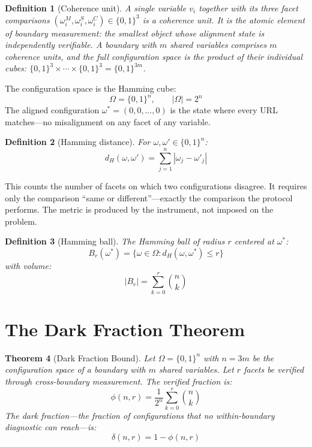 \documentclass[11pt,a4paper]{article}
\newtheorem{theorem}{Theorem}
\newtheorem{definition}[theorem]{Definition}
\begin{document}
\begin{definition}[Coherence unit]
A single variable $v_i$ together with its three facet
comparisons $(\omega_i^M, \omega_i^S, \omega_i^C) \in \{0,1\}^3$
is a \emph{coherence unit}.  It is the atomic element of
boundary measurement: the smallest object whose alignment
state is independently verifiable.  A boundary with $m$
shared variables comprises $m$ coherence units, and
the full configuration space is the product of their
individual cubes: $\{0,1\}^3 \times \cdots \times \{0,1\}^3
= \{0,1\}^{3m}$.
\end{definition}



The configuration space is the Hamming cube:
\[
\Omega = \{0,1\}^n, \qquad |\Omega| = 2^n
\]
The aligned configuration $\omega^* = (0, 0, \ldots, 0)$ is the state where every URL matches---no misalignment on any facet of any variable.

\begin{definition}[Hamming distance]
For $\omega, \omega' \in \{0,1\}^n$:
\[
d_H(\omega, \omega') = \sum_{j=1}^{n} |\omega_j - \omega'_j|
\]
\end{definition}

\noindent This counts the number of facets on which two configurations disagree. It requires only the comparison ``same or different''---exactly the comparison the protocol performs. The metric is produced by the instrument, not imposed on the problem.

\begin{definition}[Hamming ball]
The Hamming ball of radius $r$ centered at $\omega^*$:
\[
B_r(\omega^*) = \{\omega \in \Omega : d_H(\omega, \omega^*) \leq r\}
\]
with volume:
\[
|B_r| = \sum_{k=0}^{r} \binom{n}{k}
\]
\end{definition}

\section{The Dark Fraction Theorem}
\label{sec:theorem}

\begin{theorem}[Dark Fraction Bound]
\label{thm:main}
Let $\Omega = \{0,1\}^n$ with $n = 3m$ be the configuration space of a boundary with $m$ shared variables. Let $r$ facets be verified through cross-boundary measurement. The verified fraction is:
\[
\phi(n, r) = \frac{1}{2^n} \sum_{k=0}^{r} \binom{n}{k}
\]
The dark fraction---the fraction of configurations that no within-boundary diagnostic can reach---is:
\[
\delta(n, r) = 1 - \phi(n, r)
\]
\end{theorem}
\end{document}

